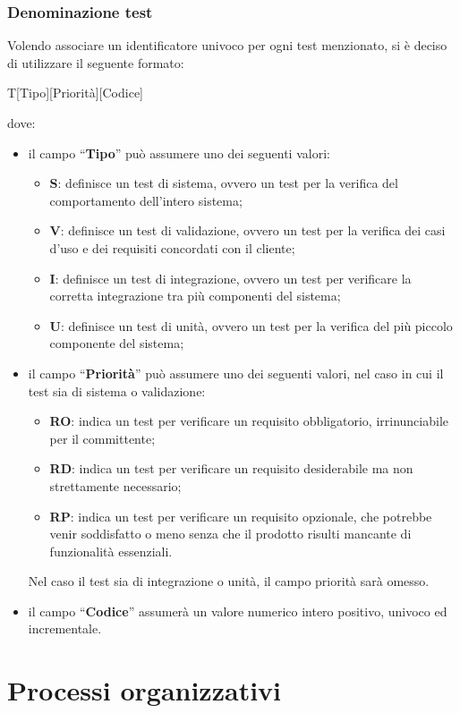 \documentclass[11pt,a4paper]{article}
\begin{document}
{	\subsubsection{Denominazione test}
	Volendo associare un identificatore univoco per ogni test menzionato, si \`e deciso di utilizzare il seguente formato:
	\begin{center}
		T[Tipo][Priorità][Codice]
	\end{center}
	dove:
	\begin{itemize}
		\item il campo “\textbf{Tipo}” può assumere uno dei seguenti valori:
		\begin{itemize}
			\item \textbf{S}: definisce un test di sistema, ovvero un test per la verifica del comportamento dell'intero sistema;
			\item \textbf{V}: definisce un test di validazione, ovvero un test per la verifica dei casi d'uso e dei requisiti concordati con il cliente;
			\item \textbf{I}: definisce un test di integrazione, ovvero un test per verificare la corretta integrazione tra più componenti del sistema;
			\item \textbf{U}: definisce un test di unità, ovvero un test per la verifica del più piccolo componente del sistema;
		\end{itemize}
		\item il campo “\textbf{Priorità}” può assumere uno dei seguenti valori, nel caso in cui il test sia di sistema o validazione:
			\begin{itemize}
				\item \textbf{RO}: indica un test per verificare un requisito obbligatorio, irrinunciabile per il committente;
				\item \textbf{RD}: indica un test per verificare un requisito desiderabile ma non strettamente necessario;
				\item \textbf{RP}: indica un test per verificare un requisito opzionale, che potrebbe venir soddisfatto o meno senza che il prodotto risulti mancante di funzionalità essenziali.
			\end{itemize}
			Nel caso il test sia di integrazione o unità, il campo priorità sarà omesso.
		\item il campo “\textbf{Codice}” assumerà un valore numerico intero positivo, univoco ed incrementale.
	\end{itemize}
	\newpage
	\section{Processi organizzativi}
	
}
\end{document}
